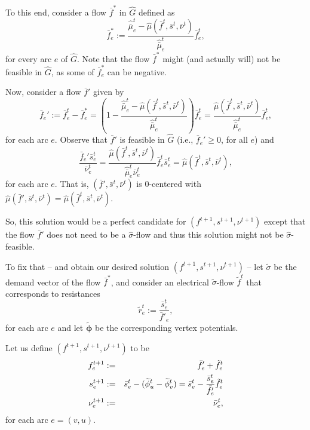 \documentclass[11pt, letterpaper]{article}
\newcommand{\hG}{\widehat{G}}
\newcommand{\tf}{\tilde{f}}
\newcommand{\of}{\bar{f}}
\newcommand{\os}{\bar{s}}
\newcommand{\tr}{\tilde{r}}
\newcommand{\onu}{\bar{\nu}}
\newcommand{\hmu}{\hat{\mu}}
\newcommand{\ohmu}{\hat{\bar{\mu}}}
\newcommand{\vnu}{\boldsymbol{\mathit{\nu}}}
\newcommand{\ovnu}{\boldsymbol{\bar{\mathit{\nu}}}}
\newcommand{\tvsigma}{\boldsymbol{\mathit{\tilde{\sigma}}}}
\newcommand{\hvsigma}{\boldsymbol{\mathit{\hat{\sigma}}}}
\newcommand{\tphi}{\widetilde{\phi}}
\newcommand{\tvphi}{\boldsymbol{\tilde{\phi}}}
\newcommand{\ff}{\boldsymbol{\mathit{f}}}
\newcommand{\tff}{\boldsymbol{\mathit{\tilde{f}}}}
\newcommand{\off}{\boldsymbol{\mathit{\bar{f}}}}
\renewcommand{\ss}{\boldsymbol{\mathit{s}}}
\newcommand{\oss}{\boldsymbol{\bar{\mathit{s}}}}
\begin{document}
To this end, consider a flow $\off^*$ in $\hG$ defined as
\begin{equation}
\label{eq:def_of_offstar}
\of^*_e := \frac{\ohmu_e^t-\hmu(\off^t,\oss^t,\ovnu^t)}{\ohmu_e^t}\of^t_e,
\end{equation}
for every arc $e$ of $\hG$. Note that the flow $\off^*$ might (and actually will) not be feasible in $\hG$, as some of $\of^*_e$ can be negative.

Now, consider a flow $\off'$ given by
\begin{equation}
\label{eq:offprime_def}
\of_e' := \of^t_e - \of^*_e = (1-\frac{\ohmu_e^t-\hmu(\off^t,\oss^t,\ovnu^t)}{\ohmu_e^t})\of^t_e=\frac{\hmu(\off^t,\oss^t,\ovnu^t)}{\ohmu_e^t}\of^t_e,
\end{equation}
for each arc $e$. Observe that $\off'$ is feasible in $\hG$ (i.e., $\of_e'\geq 0$, for all $e$) and 
\begin{equation}
\label{eq:perfect_centering_of_intermediate}
\frac{\of_e'\os_e^t}{\onu_e^t} = \frac{\hmu(\off^t,\oss^t,\ovnu^t)}{\ohmu_e^t\onu_e^t}\of^t_e \os_e^t = \hmu(\off^t,\oss^t,\ovnu^t),
\end{equation}
for each arc $e$. That is, $(\off',\oss^t,\ovnu^t)$ is $0$-centered with $\hmu(\off',\oss^t,\ovnu^t)=\hmu(\off^t,\oss^t,\ovnu^t)$.

So, this solution would be a perfect candidate for $(\ff^{t+1},\ss^{t+1},\vnu^{t+1})$ except that the flow $\off'$ does not need to be a $\hvsigma$-flow and thus this solution might not be $\hvsigma$-feasible. 

To fix that -- and obtain our desired solution $(\ff^{t+1},\ss^{t+1},\vnu^{t+1})$ -- let $\tvsigma$ be the demand vector of the flow $\off^*$, and consider an electrical $\tvsigma$-flow $\tff^t$ that corresponds to resistances
\begin{equation}
\label{eq:tfft_resistances}
\tr_e^t := \frac{\os_e^t}{\of'_e},
\end{equation}
for each arc $e$ and let $\tvphi$ be the corresponding vertex potentials.

Let us define $(\ff^{t+1},\ss^{t+1},\vnu^{t+1})$ to be
\begin{eqnarray}
f_e^{t+1} & := & \of'_e + \tf_e^t\notag\\
s_e^{t+1} & := & \os_e^t - (\tphi^t_u-\tphi^t_v) =\os_e^t - \frac{\os_e^t}{\of_e'} \tf_e^t\label{eq:new_ff_t1_def}\\
\nu_e^{t+1}& := & \onu^t_e,\notag
\end{eqnarray}
for each arc $e=(v,u)$. 
\end{document}
